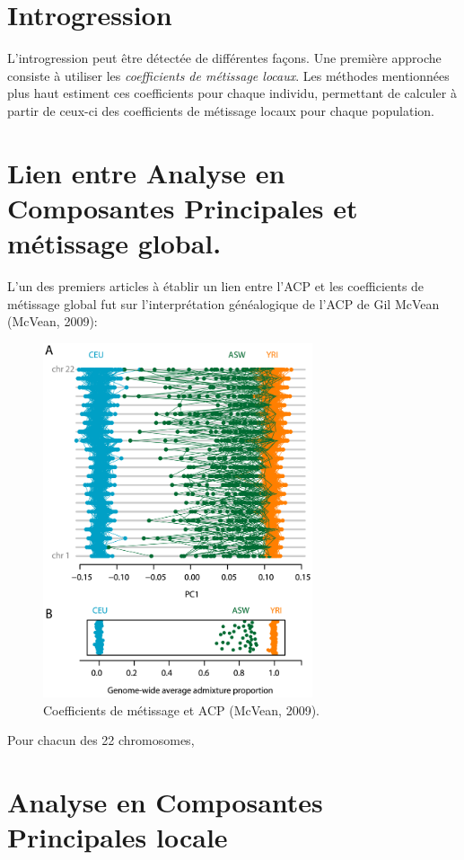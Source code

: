 \documentclass[12pt,twoside]{ugathesis}
\begin{document}
\section{Introgression}\label{introgression}

L'introgression peut être détectée de différentes façons. Une première
approche consiste à utiliser les \emph{coefficients de métissage
locaux}. Les méthodes mentionnées plus haut estiment ces coefficients
pour chaque individu, permettant de calculer à partir de ceux-ci des
coefficients de métissage locaux pour chaque population.

\section{Lien entre Analyse en Composantes Principales et métissage
global.}\label{lien-entre-analyse-en-composantes-principales-et-metissage-global.}

L'un des premiers articles à établir un lien entre l'ACP et les
coefficients de métissage global fut sur l'interprétation généalogique
de l'ACP de Gil McVean (McVean, 2009):


\begin{figure}

{\centering \includegraphics[width=300px]{figure/mcvean} 

}

\caption{Coefficients de métissage et ACP (McVean, 2009).}\label{fig:mcvean}
\end{figure}
Pour chacun des 22 chromosomes,

\section{Analyse en Composantes Principales
locale}\label{analyse-en-composantes-principales-locale}
\end{document}
